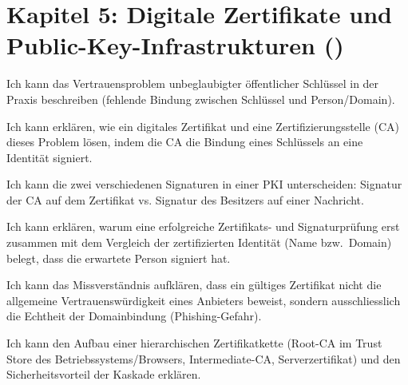 \section*{Kapitel 5: Digitale Zertifikate und Public-Key-Infrastrukturen ()}
\begin{todolist}
  \item Ich kann das Vertrauensproblem unbeglaubigter öffentlicher Schlüssel in der Praxis beschreiben (fehlende Bindung zwischen Schlüssel und Person/Domain).
  \item Ich kann erklären, wie ein digitales Zertifikat und eine Zertifizierungsstelle (\gls{CA}) dieses Problem lösen, indem die \gls{CA} die Bindung eines Schlüssels an eine Identität signiert.
  \item Ich kann die zwei verschiedenen Signaturen in einer \gls{PKI} unterscheiden: Signatur der \gls{CA} auf dem Zertifikat vs. Signatur des Besitzers auf einer Nachricht.
  \item Ich kann erklären, warum eine erfolgreiche Zertifikats- und Signaturprüfung erst zusammen mit dem Vergleich der zertifizierten Identität (Name bzw.\ Domain) belegt, dass die erwartete Person signiert hat.
  \item Ich kann das Missverständnis aufklären, dass ein gültiges Zertifikat nicht die allgemeine Vertrauenswürdigkeit eines Anbieters beweist, sondern ausschliesslich die Echtheit der Domainbindung (Phishing-Gefahr).
  \item Ich kann den Aufbau einer hierarchischen Zertifikatkette (Root-\gls{CA} im Trust Store des Betriebssystems/Browsers, Intermediate-\gls{CA}, Serverzertifikat) und den Sicherheitsvorteil der Kaskade erklären.
\end{todolist}
